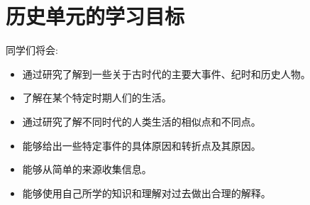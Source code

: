 \chapter{历史单元的学习目标}
    同学们将会:\par
    \begin{itemize}
      \item 通过研究了解到一些关于古时代的主要大事件、纪时和历史人物。
      \item 了解在某个特定时期人们的生活。
      \item 通过研究了解不同时代的人类生活的相似点和不同点。
      \item 能够给出一些特定事件的具体原因和转折点及其原因。
      \item 能够从简单的来源收集信息。
      \item 能够使用自己所学的知识和理解对过去做出合理的解释。
    \end{itemize}  


    
